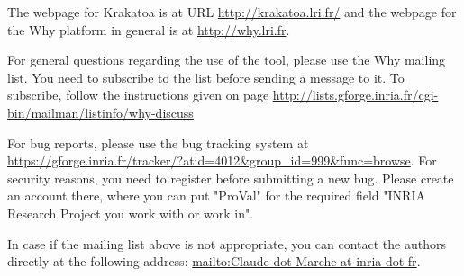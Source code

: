 \documentclass[a4paper,11pt,twoside,openright]{report}
\begin{document}
The webpage for Krakatoa is at URL \url{http://krakatoa.lri.fr/} and
the webpage for the Why platform in general is at
\url{http://why.lri.fr}.

For general questions regarding the use of the tool, please use the
Why mailing list. You need to subscribe to the list before sending a
message to it. To subscribe, follow the instructions given on page
\url{http://lists.gforge.inria.fr/cgi-bin/mailman/listinfo/why-discuss}

For bug reports, please use the bug tracking system at
\url{https://gforge.inria.fr/tracker/?atid=4012&group_id=999&func=browse}. For
security reasons, you need to register before submitting a new
bug. Please create an account there, where you can put "ProVal" for
the required field "INRIA Research Project you work with or work in".

In case if the mailing list above is not appropriate, you can contact
the authors directly at the following address: \url{mailto:Claude dot
  Marche at inria dot fr}.

\cleardoublepage



%
\cleardoublepage

\printindex
\cleardoublepage
\end{document}
